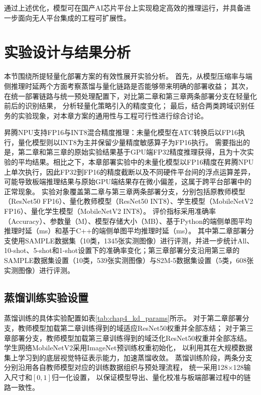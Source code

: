 通过上述优化，模型可在国产AI芯片平台上实现稳定高效的推理运行，并具备进一步面向无人平台集成的工程可扩展性。



\section{实验设计与结果分析}

本节围绕所提轻量化部署方案的有效性展开实验分析。
首先，从模型压缩率与端侧推理时延两个方面考察蒸馏与量化链路是否能够带来明确的部署收益；
其次，在统一部署链路与统一预处理配置下，对比第二章和第三章两条部署分支在轻量化前后的识别结果，
分析轻量化策略引入的精度变化；
最后，结合两类跨域识别任务的实验现象，对本章方案的通用性与工程可行性进行综合讨论。

昇腾NPU支持FP16与INT8混合精度推理：未量化模型在ATC转换后以FP16执行，量化模型则以INT8为主并保留少量精度敏感算子为FP16执行。
需要指出的是，第二章和第三章的原始实验结果基于GPU端FP32精度推理获得，且为十次实验的平均结果。相比之下，本章部署实验中的未量化模型以FP16精度在昇腾NPU上单次执行，因此FP32到FP16的精度截断以及不同硬件平台间的浮点运算差异，可能导致板端推理结果与原始GPU端结果存在微小偏差，这属于跨平台部署中的正常现象。
实验对象覆盖第二章与第三章两条部署分支，分别包括原教师模型（ResNet50 FP16）、量化教师模型（ResNet50 INT8）、学生模型（MobileNetV2 FP16）、量化学生模型（MobileNetV2 INT8）。
评价指标采用准确率（Accuracy）、参数量（M）、模型存储大小（MB）、基于Python的端侧单图平均推理时延（ms）和基于C++的端侧单图平均推理时延（ms）。
其中第二章部署分支使用SAMPLE数据集（10类，1345张实测图像）进行评测，并进一步统计All、10-shot、5-shot和1-shot设置下的准确率变化；第三章部署分支沿用第三章的SAMPLE数据集设置（10类，539张实测图像）与S2M-5数据集设置（5类，608张实测图像）进行评测。

\subsection{蒸馏训练实验设置}

蒸馏训练的具体实验配置如表\ref{tab:chap4_kd_params}所示。
对于第二章部署分支，教师模型加载第二章训练得到的域适应ResNet50权重并全部冻结；
对于第三章部署分支，教师模型加载第三章训练得到的域泛化ResNet50权重并全部冻结。
学生网络MobileNetV2采用ImageNet预训练权重初始化，
以利用其在大规模数据集上学习到的底层视觉特征表示能力，加速蒸馏收敛。
蒸馏训练阶段，两条分支分别沿用各自教师模型对应的训练数据组织与预处理流程，
统一采用128$\times$128输入尺寸和$[0,1]$归一化设置，
以保证模型导出、量化校准与板端部署过程中的链路一致性。

